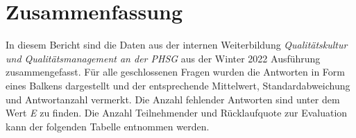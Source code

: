 \documentclass[11pt]{article}
\begin{document}
\begin{titlepage}

\end{titlepage}


\pagestyle{fancy}
	\fancyhf{}
	\renewcommand{\headrulewidth}{0pt}



\section{Zusammenfassung}
In diesem Bericht sind die Daten aus der internen Weiterbildung \textit{Qualitätskultur und Qualitätsmanagement an der PHSG} aus der Winter 2022 Ausführung zusammengefasst. Für alle geschlossenen Fragen wurden die Antworten in Form eines Balkens dargestellt und der entsprechende Mittelwert, Standardabweichung und Antwortanzahl vermerkt. Die Anzahl fehlender Antworten sind unter dem Wert \textit{E} zu finden. Die Anzahl Teilnehmender und Rücklaufquote zur Evaluation kann der folgenden Tabelle entnommen werden.
\end{document}
